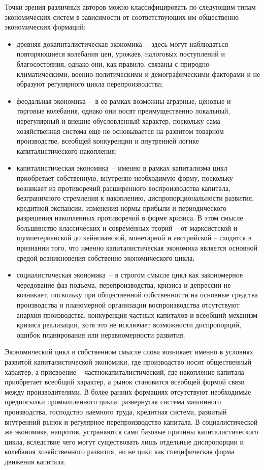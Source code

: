 Точки зрения различных авторов можно классифицировать по следующим типам экономических систем в зависимости от соответствующих им общественно-экономических формаций:
\begin{itemize}
    \item древняя докапиталистическая экономика – здесь могут наблюдаться повторяющиеся колебания цен, урожаев, налоговых поступлений и благосостояния, однако они, как правило, связаны с природно-климатическими, военно-политическими и демографическими факторами и не образуют регулярного цикла перепроизводства;
    \item феодальная экономика – в ее рамках возможны аграрные, ценовые и торговые колебания, однако они носят преимущественно локальный, нерегулярный и внешне обусловленный характер, поскольку сама хозяйственная система еще не основывается на развитом товарном производстве, всеобщей конкуренции и внутренней логике капиталистического накопления;
    \item капиталистическая экономика – именно в рамках капитализма цикл приобретает собственную, внутренне необходимую форму, поскольку возникает из противоречий расширенного воспроизводства капитала, безграничного стремления к накоплению, диспропорциональности развития, кредитной экспансии, изменения нормы прибыли и периодического разрешения накопленных противоречий в форме кризиса. В этом смысле большинство классических и современных теорий – от марксистской и шумпетерианской до кейнсианской, монетарной и австрийской – сходятся в признании того, что именно капиталистическая экономика является основной средой возникновения собственно экономического цикла;
    \item социалистическая экономика – в строгом смысле цикл как закономерное чередование фаз подъема, перепроизводства, кризиса и депрессии не возникает, поскольку при общественной собственности на основные средства производства и планомерной организации воспроизводства отсутствуют анархия производства, конкуренция частных капиталов и всеобщий механизм кризиса реализации, хотя это не исключает возможности диспропорций, ошибок планирования или неравномерности развития.
\end{itemize}

Экономический цикл в собственном смысле слова возникает именно в условиях развитой капиталистической экономики, где производство носит общественный характер, а присвоение – частнокапиталистический, где накопление капитала приобретает всеобщий характер, а рынок становится всеобщей формой связи между производителями. В более ранних формациях отсутствуют необходимые предпосылки промышленного цикла: развернутая система машинного производства, господство наемного труда, кредитная система, развитый внутренний рынок и регулярное перепроизводство капитала. В социалистической же экономике, напротив, устраняются сами базовые причины капиталистического цикла, вследствие чего могут существовать лишь отдельные диспропорции и колебания хозяйственного развития, но не цикл как специфическая форма движения капитала.

